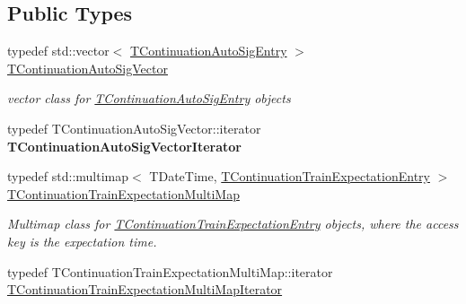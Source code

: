 \subsection*{Public Types}
\begin{DoxyCompactItemize}
\item 
\mbox{\label{class_t_train_controller_a1908f7d1a5dcfebf2f747efbdd6f4681}} 
typedef std\+::vector$<$ \mbox{\hyperlink{class_t_train_controller_1_1_t_continuation_auto_sig_entry}{T\+Continuation\+Auto\+Sig\+Entry}} $>$ \mbox{\hyperlink{class_t_train_controller_a1908f7d1a5dcfebf2f747efbdd6f4681}{T\+Continuation\+Auto\+Sig\+Vector}}
\begin{DoxyCompactList}\small\item\em vector class for \mbox{\hyperlink{class_t_train_controller_1_1_t_continuation_auto_sig_entry}{T\+Continuation\+Auto\+Sig\+Entry}} objects \end{DoxyCompactList}\item 
\mbox{\label{class_t_train_controller_a0c129f8836ec5be031f4163320ff3c0a}} 
typedef T\+Continuation\+Auto\+Sig\+Vector\+::iterator {\bfseries T\+Continuation\+Auto\+Sig\+Vector\+Iterator}
\item 
\mbox{\label{class_t_train_controller_a36525478ab0d9f59e486b8c030acd87c}} 
typedef std\+::multimap$<$ T\+Date\+Time, \mbox{\hyperlink{class_t_train_controller_1_1_t_continuation_train_expectation_entry}{T\+Continuation\+Train\+Expectation\+Entry}} $>$ \mbox{\hyperlink{class_t_train_controller_a36525478ab0d9f59e486b8c030acd87c}{T\+Continuation\+Train\+Expectation\+Multi\+Map}}
\begin{DoxyCompactList}\small\item\em Multimap class for \mbox{\hyperlink{class_t_train_controller_1_1_t_continuation_train_expectation_entry}{T\+Continuation\+Train\+Expectation\+Entry}} objects, where the access key is the expectation time. \end{DoxyCompactList}\item 
\mbox{\label{class_t_train_controller_ad10dfce8ec2a66858af7fbeb1529257f}} 
typedef T\+Continuation\+Train\+Expectation\+Multi\+Map\+::iterator \mbox{\hyperlink{class_t_train_controller_ad10dfce8ec2a66858af7fbeb1529257f}{T\+Continuation\+Train\+Expectation\+Multi\+Map\+Iterator}}

\end{DoxyCompactItemize}
